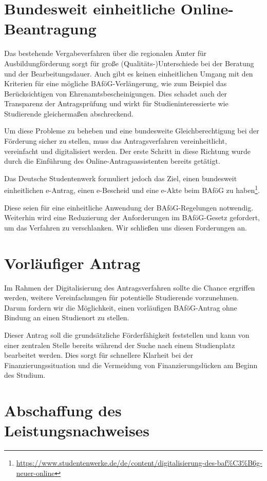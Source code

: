 \documentclass[DIV=calc]{scrartcl}
\begin{document}
\section{Bundesweit einheitliche Online-Beantragung}

Das bestehende Vergabeverfahren über die regionalen Ämter für Ausbildungförderung sorgt für große (Qualitäts-)Unterschiede bei der Beratung und der Bearbeitungsdauer. Auch gibt es keinen einheitlichen Umgang mit den Kriterien für eine mögliche BAföG-Verlängerung, wie zum Beispiel das Berücksichtigen von Ehrenamtsbescheinigungen. Dies schadet auch der Transparenz der Antragsprüfung und wirkt für Studieninteressierte wie Studierende gleichermaßen abschreckend.

Um diese Probleme zu beheben und eine bundesweite Gleichberechtigung bei der Förderung sicher zu stellen, muss das Antragsverfahren vereinheitlicht, vereinfacht und digitalisiert werden. Der erste Schritt in diese Richtung wurde durch die Einführung des Online-Antragsassistenten bereits getätigt.

Das Deutsche Studentenwerk formuliert jedoch das Ziel, \glqq einen bundesweit einheitlichen e-Antrag, einen e-Bescheid und eine e-Akte beim BAföG zu haben\grqq{}\footnote{\url{https://www.studentenwerke.de/de/content/digitalisierung-des-baf\%C3\%B6g-neuer-online}}.

Diese seien für eine einheitliche Anwendung der BAföG-Regelungen notwendig. Weiterhin wird eine Reduzierung der Anforderungen im BAföG-Gesetz gefordert, um das Verfahren zu verschlanken. Wir schließen uns diesen Forderungen an.
\newpage
\section{Vorläufiger Antrag}

Im Rahmen der Digitalisierung des Antragsverfahren sollte die Chance ergriffen werden, weitere Vereinfachungen für potentielle Studierende vorzunehmen. Darum fordern wir die Möglichkeit, einen vorläufigen BAföG-Antrag ohne Bindung an einen Studienort zu stellen. 

Dieser Antrag soll die grundsätzliche Förderfähigkeit feststellen und kann von einer zentralen Stelle bereits während der Suche nach einem Studienplatz bearbeitet werden. Dies sorgt für schnellere Klarheit bei der Finanzierungssituation und die Vermeidung von Finanzierungslücken am Beginn des Studium.

\section{Abschaffung des Leistungsnachweises}
\end{document}
